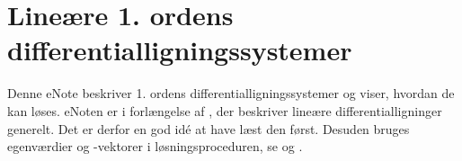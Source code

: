 
\setcounter{chapter}{11} %


\chapter{Lineære 1. ordens differentialligningssystemer} \label{tn12}

\begin{basis}
Denne eNote beskriver 1. ordens differentialligningssystemer og viser, hvordan de kan løses. eNoten er i forlængelse af , der beskriver lineære differentialligninger generelt. Det er derfor en god idé at have læst den først. Desuden bruges egenværdier og -vektorer i løsningsproceduren, se  og . 
\end{basis}

